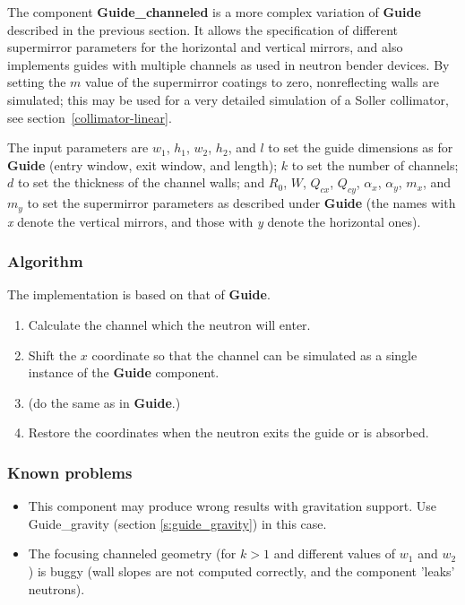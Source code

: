 
The component \textbf{Guide\_channeled} is a more complex variation of \textbf{Guide}
described in the previous section. It allows the specification
of different supermirror parameters for the horizontal and vertical
mirrors, and also implements guides with multiple channels as used in
neutron bender devices. By setting the $m$ value of the supermirror
coatings to zero, nonreflecting walls are simulated;
this may be used for a very detailed simulation of a Soller collimator,
see section~\ref{collimator-linear}.

The input parameters are $w_1$, $h_1$, $w_2$, $h_2$, and $l$
to set the guide dimensions as for \textbf{Guide}
(entry window, exit window, and length);
$k$ to set the number of channels; $d$ to set the thickness of the
channel walls; and $R_0$, $W$, $Q_{cx}$, $Q_{cy}$, $\alpha_x$, $\alpha_y$,
$m_x$, and $m_y$ to set the supermirror parameters as described under \textbf{Guide}
(the names with \textit{x} denote the vertical mirrors,
and those with \textit{y} denote the horizontal ones).

\subsubsection{Algorithm}
The implementation is based on that of \textbf{Guide}.
\begin{enumerate}
\item Calculate the channel which the neutron will enter.
\item Shift the $x$ coordinate so that the channel can be simulated
as a single instance of the \textbf{Guide} component.
\item (do the same as in \textbf{Guide}.)
\item Restore the coordinates when the
neutron exits the guide or is absorbed.
\end{enumerate}

\subsubsection{Known problems}
\begin{itemize}
\item This component may produce wrong results with gravitation support.
Use Guide\_gravity (section \ref{s:guide_gravity}) in this case.
\item The focusing channeled geometry (for $k > 1$ and different
values of $w_1$ and $w_2$) is buggy
(wall slopes are not computed correctly, and the component 'leaks' neutrons).
\end{itemize}
\newpage


